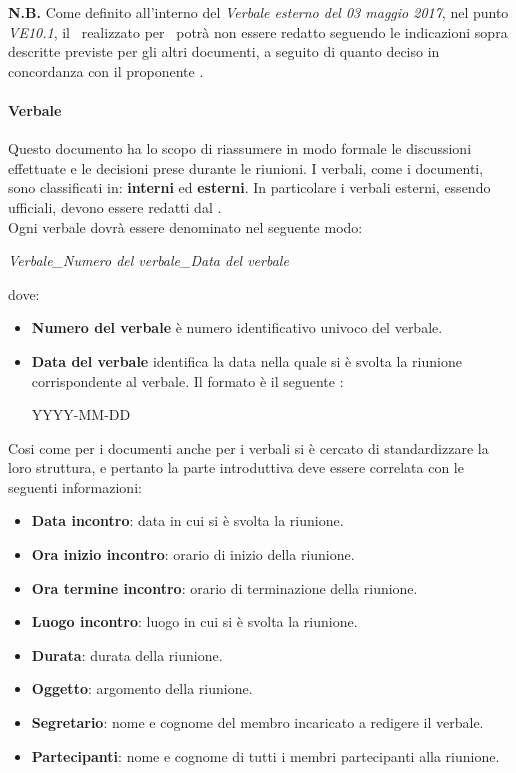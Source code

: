 \textbf{N.B.} Come definito all'interno del \textit{Verbale esterno del 03 maggio 2017}, nel punto \textit{VE10.1}, il \MU\ realizzato per \progettoShort\ potrà non essere redatto seguendo le indicazioni sopra descritte previste per gli altri documenti, a seguito di quanto deciso in concordanza con il proponente \RB.

\paragraph{Verbale}
Questo documento ha lo scopo di riassumere in modo formale le discussioni effettuate e le decisioni prese durante le riunioni. I verbali, come i documenti, sono classificati in:
\textbf{interni} ed \textbf{esterni}. In particolare i verbali esterni, essendo ufficiali, devono essere redatti dal \Pm. \\
Ogni verbale dovrà essere denominato nel seguente modo:
\begin{center}
  \textit{{Verbale}\_{Numero del verbale}\_{Data del verbale}}
\end{center}
dove:
\begin{itemize}
  \item \textbf{Numero del verbale} è numero identificativo univoco del verbale.
  \item \textbf{Data del verbale} identifica la data nella quale si è svolta la
  riunione corrispondente al verbale. Il formato è il seguente :
  \begin{center}
  YYYY-MM-DD
  \end{center}
\end{itemize}
Cosi come per i documenti anche per i verbali si è cercato di standardizzare la loro struttura, e pertanto la  parte introduttiva deve essere correlata con le seguenti informazioni:
\begin{itemize}
  \item \textbf{Data incontro}: data in cui si è svolta la riunione.
  \item \textbf{Ora inizio incontro}: orario di inizio della riunione.
  \item \textbf{Ora termine incontro}: orario di terminazione della riunione.
  \item \textbf{Luogo incontro}: luogo in cui si è svolta la riunione.
  \item \textbf{Durata}: durata della riunione.
  \item \textbf{Oggetto}: argomento della riunione.
  \item \textbf{Segretario}: nome e cognome del membro incaricato a redigere il
  verbale.
  \item \textbf{Partecipanti}: nome e cognome di tutti i membri partecipanti alla riunione.
  
\end{itemize}

